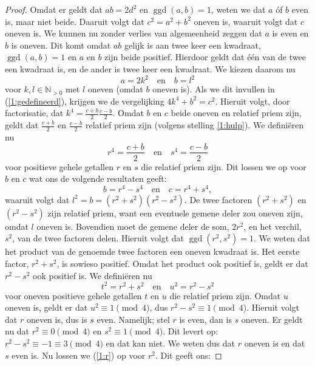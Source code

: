 \documentclass[12pt,reqno]{article}
\newcommand*{\NO}{\ensuremath{\mathbb{N}_{>0}}}
\theoremstyle{theorem}
\theoremstyle{definition}
\DeclareMathOperator{\ggd}{ggd}
\begin{document}
\begin{proof}
		Omdat er geldt dat $ab = 2d^2$ en $\ggd(a,b)=1$, weten we dat $a$ \'of $b$ even is, maar niet beide. Daaruit volgt dat $c^2 = a^2 + b^2$ oneven is, waaruit volgt dat $c$ oneven is. We kunnen nu zonder verlies van algemeenheid zeggen dat $a$ is even en $b$ is oneven. Dit komt omdat $ab$ gelijk is aan twee keer een kwadraat, $\ggd(a,b)=1$ en $a$ en $b$ zijn beide positief. Hierdoor geldt dat \'e\'en van de twee een kwadraat is, en de ander is twee keer een kwadraat. We kiezen daarom nu
		\begin{equation}
			a = 2k^2 \quad \text{en} \quad b = l^2
		\end{equation}
		voor $k,l\in\NO$ met $l$ oneven (omdat $b$ oneven is). Als we dit invullen in (\ref{1:gedefineerd}), krijgen we de vergelijking $4k^4 + b^2 = c^2$. Hieruit volgt, door factorisatie, dat $k^4 = \frac{c+b}{2}\frac{c-b}{2}$. Omdat $b$ en $c$ beide oneven en relatief priem zijn, geldt dat $\frac{c+b}{2}$ en $\frac{c-b}{2}$ relatief priem zijn (volgens stelling \ref{1:hulp}). We defini\"eren nu
		\begin{equation*}
			r^4 = \frac{c+b}{2} \quad \text{en} \quad s^4 = \frac{c-b}{2}
		\end{equation*}
		voor positieve gehele getallen $r$ en $s$ die relatief priem zijn. Dit lossen we op voor $b$ en $c$ wat ons de volgende resultaten geeft:
		\begin{equation*}
			b = r^4 - s^4 \quad \text{en} \quad c = r^4 + s^4,
		\end{equation*}
		waaruit volgt dat $l^2 = b = (r^2 + s^2) (r^2 - s^2)$. De twee factoren $(r^2 + s^2)$ en $(r^2 - s^2)$ zijn relatief priem, want een eventuele gemene deler zou oneven zijn, omdat $l$ oneven is. Bovendien moet de gemene deler de som, $2r^2$, en het verchil, $s^2$, van de twee factoren delen. Hieruit volgt dat $\ggd(r^2,s^2) = 1$. We weten dat het product van de genoemde twee factoren een oneven kwadraat is. Het eerste factor, $r^2 + s^2$, is sowieso positief. Omdat het product ook positief is, geldt er dat $r^2 - s^2$ ook positief is. We defini\"eren nu
		\begin{equation}\label{1:r}
			t^2 = r^2 + s^2 \quad \text{en} \quad u^2 = r^2 - s^2
		\end{equation}
		voor oneven positieve gehele getallen $t$ en $u$ die relatief priem zijn. Omdat $u$ oneven is, geldt er dat $u^2 \equiv 1 \pmod{4}$, dus $r^2 - s^2 \equiv 1 \pmod{4}$. Hieruit volgt dat $r$ oneven is, dus is $s$ even. Namelijk; stel $r$ is even, dan is $s$ oneven. Er geldt nu dat $r^2 \equiv 0 \pmod{4}$ en $s^2 \equiv 1 \pmod{4}$. Dit levert op: $r^2 - s^2 \equiv -1 \equiv 3 \pmod{4}$ en dat kan niet. We weten dus dat $r$ oneven is en dat $s$ even is. Nu lossen we  (\ref{1:r}) op voor $r^2$. Dit geeft ons:

\end{proof}
\end{document}
